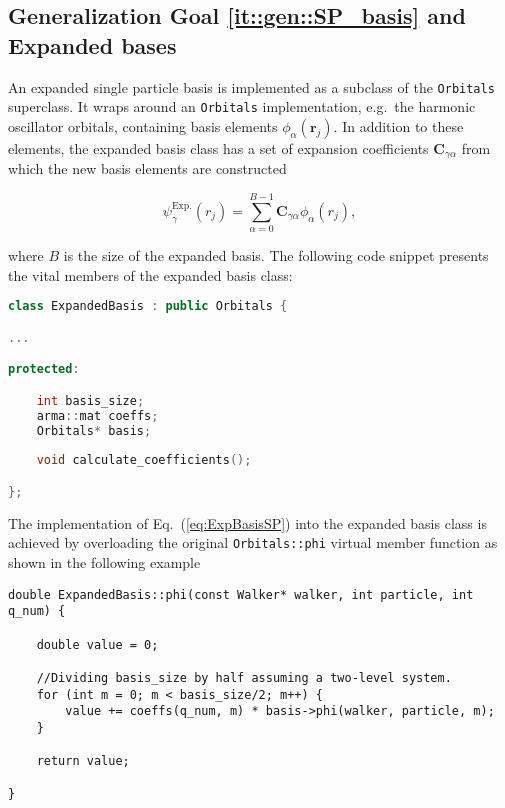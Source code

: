 \subsection{Generalization Goal \ref{it::gen::SP_basis} and Expanded bases}

An expanded single particle basis is implemented as a subclass of the \verb+Orbitals+ superclass. It wraps around an \verb+Orbitals+ implementation, e.g.~the harmonic oscillator orbitals, containing basis elements $\phi_\alpha(\mathbf{r}_j)$. In addition to these elements, the expanded basis class has a set of expansion coefficients $\mathbf{C}_{\gamma\alpha}$ from which the new basis elements are constructed

\begin{equation}
\label{eq:ExpBasisSP}
 \psi_\gamma^\mathrm{Exp.}(r_j) = \sum_{\alpha=0}^{B - 1} \mathbf{C}_{\gamma\alpha}\phi_\alpha(r_j), 
\end{equation}

where $B$ is the size of the expanded basis. The following code snippet presents the vital members of the expanded basis class: 

\vspace{0.5cm}
\begin{lstlisting}[language=C++, caption={The declaration of the expanded basis class. The vital members are the size of the basis, the expansion coefficients and another basis in which the new are expanded. A method for calculating the coefficients is present, but the actual implementation has not been a focus of this thesis.}]
class ExpandedBasis : public Orbitals {

...

protected:

    int basis_size;
    arma::mat coeffs;
    Orbitals* basis;
    
    void calculate_coefficients();

};

\end{lstlisting}


The implementation of Eq.~(\ref{eq:ExpBasisSP}) into the expanded basis class is achieved by overloading the original \verb+Orbitals::phi+ virtual member function as shown in the following example

\vspace{0.5cm}
\begin{lstlisting}[caption=The explicit implementation of the expanded basis single particle wave function. The wave function is evaluated by expanding a given basis in a set of expansion coefficients (see the previous code example).]
double ExpandedBasis::phi(const Walker* walker, int particle, int q_num) {

    double value = 0;
    
    //Dividing basis_size by half assuming a two-level system.
    for (int m = 0; m < basis_size/2; m++) {
        value += coeffs(q_num, m) * basis->phi(walker, particle, m);
    }

    return value;

}
\end{lstlisting}

